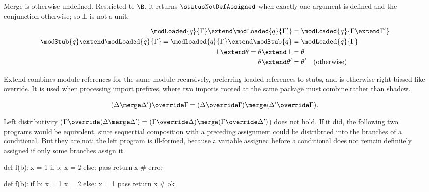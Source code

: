 \noindent Merge is otherwise undefined. Restricted to $\B$, it returns $\statusNotDefAssigned$ when exactly one argument is defined and the conjunction otherwise; so $\bot$ is not a unit.

\begin{definition}
\label{def:extend}
{\small
\begin{align*}
\modLoaded{q}{\Gamma} \extend \modLoaded{q}{\Gamma'} &= \modLoaded{q}{\Gamma \extend \Gamma'} \\
\modStub{q} \extend \modLoaded{q}{\Gamma} = \modLoaded{q}{\Gamma} \extend \modStub{q} &= \modLoaded{q}{\Gamma} \\
\bot \extend \theta = \theta \extend \bot &= \theta \\
\theta \extend \theta' &= \theta' \quad (\text{otherwise})
\end{align*}}
\end{definition}

\noindent Extend combines module references for the same module recursively, preferring loaded references to stubs, and is otherwise right-biased like override. It is used when processing import prefixes, where two imports rooted at the same package must combine rather than shadow.

\begin{lemma}
\label{lem:right-distributivity}
\[
(\Delta \merge \Delta') \override \Gamma = (\Delta \override \Gamma) \merge (\Delta' \override \Gamma).
\]
\end{lemma}

\noindent Left distributivity ($\Gamma \override (\Delta \merge \Delta') = (\Gamma \override \Delta) \merge
(\Gamma \override \Delta')$) does not hold. If it did, the following two programs would be equivalent, since
sequential composition with a preceding assignment could be distributed into the branches of a conditional.
But they are not: the left program is ill-formed, because a variable assigned before a conditional does not
remain definitely assigned if only some branches assign it.
\vspace{-\medskipamount}

\begin{minipage}[t]{0.48\textwidth}
\begin{python}
def f(b):
    x = 1
    if b:
        x = 2
    else:
        pass
    return x  # error
\end{python}
\end{minipage}
\hfill
\begin{minipage}[t]{0.48\textwidth}
\begin{python}
def f(b):
    if b:
        x = 1
        x = 2
    else:
        x = 1
        pass
    return x  # ok
\end{python}
\end{minipage}

